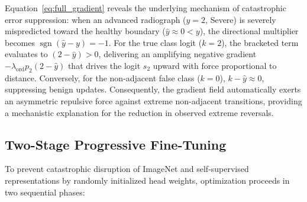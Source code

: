 \documentclass[10pt,journal]{IEEEtran}
\begin{document}
Equation~\eqref{eq:full_gradient} reveals the underlying mechanism of catastrophic error suppression: when an advanced radiograph ($y=2$, Severe) is severely mispredicted toward the healthy boundary ($\hat{y} \approx 0 < y$), the directional multiplier becomes $\operatorname{sgn}(\hat{y} - y) = -1$. For the true class logit ($k=2$), the bracketed term evaluates to $(2 - \hat{y}) > 0$, delivering an amplifying negative gradient $-\lambda_{\text{ord}} p_2 (2 - \hat{y})$ that drives the logit $s_2$ upward with force proportional to distance. Conversely, for the non-adjacent false class ($k=0$), $k - \hat{y} \approx 0$, suppressing benign updates. Consequently, the gradient field automatically exerts an asymmetric repulsive force against extreme non-adjacent transitions, providing a mechanistic explanation for the reduction in observed extreme reversals.

\subsection{Two-Stage Progressive Fine-Tuning}
\label{subsec:training}

To prevent catastrophic disruption of ImageNet and self-supervised representations by randomly initialized head weights, optimization proceeds in two sequential phases:
\end{document}
